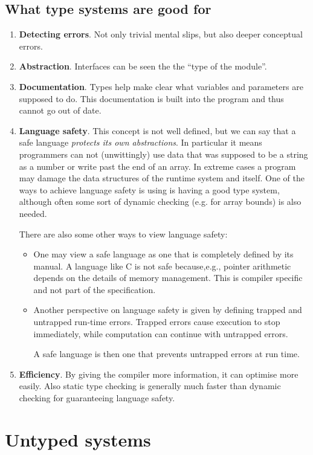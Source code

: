 \subsection{What type systems are good for}
\begin{enumerate}
\item \textbf{Detecting errors}. Not only trivial mental slips, but also deeper conceptual errors.
\item \textbf{Abstraction}. Interfaces can be seen the the ``type of the module''.
\item \textbf{Documentation}. Types help make clear what variables and parameters are supposed to do. This documentation is built into the program and thus cannot go out of date.
\item \textbf{Language safety}. This concept is not well defined, but we can say that a safe language \textit{protects its own abstractions}. In particular it means programmers can not (unwittingly) use data that was supposed to be a string as a number or write past the end of an array. In extreme cases a program may damage the data structures of the runtime system and itself. One of the ways to achieve language safety is using is having a good type system, although often some sort of dynamic checking (e.g. for array bounds) is also needed.

There are also some other ways to view language safety:
\begin{itemize}
\item One may view a safe language as one that is completely defined by its manual. A language like C is not safe because,e.g., pointer arithmetic depends on the details of memory management. This is compiler specific and not part of the specification.
\item Another perspective on language safety is given by defining trapped and untrapped run-time errors. Trapped errors cause execution to stop immediately, while computation can continue with untrapped errors.

A safe language is then one that prevents untrapped errors at run time.
\end{itemize}
\item \textbf{Efficiency}. By giving the compiler more information, it can optimise more easily. Also static type checking is generally much faster than dynamic checking for guaranteeing language safety.
\end{enumerate}


\section{Untyped systems}


